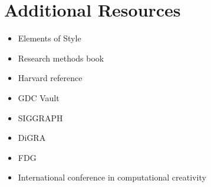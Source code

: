 \documentclass{../fal_assignment}
\begin{document}
\section*{Additional Resources}

\begin{itemize}
     \item Elements of Style
     \item Research methods book
     \item Harvard reference
     \item GDC Vault
     \item SIGGRAPH
     \item DiGRA
     \item FDG
     \item International conference in computational creativity
     
    
\end{itemize}
\end{document}
